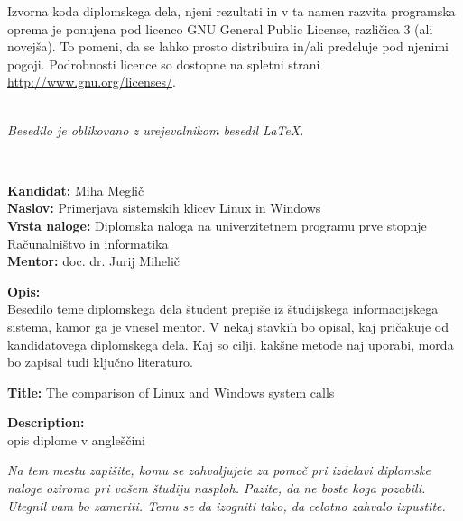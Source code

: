 \documentclass[a4paper,12pt,openright]{book}
\newcommand{\ttitle}{Primerjava sistemskih klicev Linux in Windows}
\newcommand{\ttitleEn}{The comparison of Linux and Windows system calls}
\newcommand{\tauthor}{Miha Meglič}
\newcommand{\clearemptydoublepage}{\newpage{\pagestyle{empty}\cleardoublepage}}
\begin{document}
\vspace*{1cm}
{\small \noindent
	Izvorna koda diplomskega dela, njeni rezultati in v ta namen razvita programska oprema je ponujena pod licenco GNU General Public License,
	različica 3 (ali novejša). To pomeni, da se lahko prosto distribuira in/ali predeluje pod njenimi pogoji.
	Podrobnosti licence so dostopne na spletni strani \url{http://www.gnu.org/licenses/}.
}

\vfill
\begin{center} 
	\ \\ \vfill
	{\em
		Besedilo je oblikovano z urejevalnikom besedil \LaTeX.}
\end{center}

\clearemptydoublepage

\thispagestyle{empty}
\
\vfill

\bigskip
\noindent\textbf{Kandidat:} \tauthor\\
\noindent\textbf{Naslov:} \ttitle\\
\noindent\textbf{Vrsta naloge:} Diplomska naloga na univerzitetnem programu prve stopnje Računalništvo in informatika \\
\noindent\textbf{Mentor:} doc. dr. Jurij Mihelič

\bigskip
\noindent\textbf{Opis:}\\
Besedilo teme diplomskega dela študent prepiše iz študijskega informacijskega sistema, kamor ga je vnesel mentor. 
V nekaj stavkih bo opisal, kaj pričakuje od kandidatovega diplomskega dela. 
Kaj so cilji, kakšne metode naj uporabi, morda bo zapisal tudi ključno literaturo.

\bigskip
\noindent\textbf{Title:} \ttitleEn

\bigskip
\noindent\textbf{Description:}\\
opis diplome v angleščini

\vfill



\vspace{2cm}

\clearemptydoublepage

\thispagestyle{empty}\mbox{}\vfill\null\it%
\noindent
Na tem mestu zapišite, komu se zahvaljujete za pomoč pri izdelavi diplomske naloge oziroma pri vašem študiju nasploh. Pazite, da ne boste koga pozabili. Utegnil vam bo zameriti. Temu se da izogniti tako, da celotno zahvalo izpustite.
\rm\normalfont

\clearemptydoublepage
\end{document}
